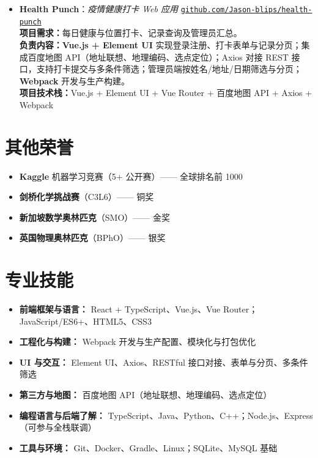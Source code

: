 \documentclass[a4paper]{article}
\begin{document}
\begin{itemize}[leftmargin=0pt, itemsep=8pt, label={}]
\item
  \textbf{Health Punch}：\textit{疫情健康打卡 Web 应用}
  \hfill \href{https://github.com/Jason-blips/health-punch}{\texttt{github.com/Jason-blips/health-punch}}\\[2pt]
  \textbf{项目需求：}每日健康与位置打卡、记录查询及管理员汇总。\\
  \textbf{负责内容：}\textbf{Vue.js + Element UI} 实现登录注册、打卡表单与记录分页；集成百度地图 API（地址联想、地理编码、选点定位）；Axios 对接 REST 接口，支持打卡提交与多条件筛选；管理员端按姓名/地址/日期筛选与分页；\textbf{Webpack} 开发与生产构建。\\
  \textbf{项目技术栈：}Vue.js \;+\; Element UI \;+\; Vue Router \;+\; 百度地图 API \;+\; Axios \;+\; Webpack
\end{itemize}
\vspace{0.2cm}

\section{其他荣誉}
\begin{itemize}
  \item \textbf{Kaggle} 机器学习竞赛（5+ 公开赛）—— 全球排名前 1000
  \item \textbf{剑桥化学挑战赛}（C3L6）—— 铜奖
  \item \textbf{新加坡数学奥林匹克}（SMO）—— 金奖
  \item \textbf{英国物理奥林匹克}（BPhO）—— 银奖
\end{itemize}
\vspace{0.2cm}

\section{专业技能}
\begin{itemize}
    \item \textbf{前端框架与语言：} React + TypeScript、Vue.js、Vue Router；JavaScript/ES6+、HTML5、CSS3

    \item \textbf{工程化与构建：} Webpack 开发与生产配置、模块化与打包优化

    \item \textbf{UI 与交互：} Element UI、Axios、RESTful 接口对接、表单与分页、多条件筛选

    \item \textbf{第三方与地图：} 百度地图 API（地址联想、地理编码、选点定位）

    \item \textbf{编程语言与后端了解：} TypeScript、Java、Python、C++；Node.js、Express（可参与全栈联调）

    \item \textbf{工具与环境：} Git、Docker、Gradle、Linux；SQLite、MySQL 基础
\end{itemize}
\end{document}
